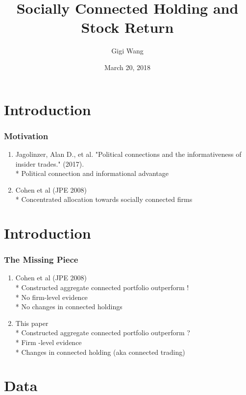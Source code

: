\documentclass{beamer}
\begin{document}
\title{Socially Connected Holding and Stock Return}
\author{Gigi Wang}
\date{March 20, 2018}
\maketitle

\section{Introduction}
\begin{frame}
\frametitle{Motivation}
\begin{enumerate}
	\item Jagolinzer, Alan D., et al. "Political connections and the informativeness of insider trades." (2017).
  \\ *  Political connection and informational advantage
  \item Cohen et al (JPE 2008)
  \\ *  Concentrated allocation towards socially connected firms
\end{enumerate}

\end{frame}


\section{Introduction}
\begin{frame}
\frametitle{The Missing Piece}
\begin{enumerate}
  \item Cohen et al (JPE 2008)
  \\ *  Constructed aggregate connected portfolio outperform !
  \\ *  No firm-level evidence
  \\ *  No changes in connected holdings
  \item  This paper
  \\ * Constructed aggregate connected portfolio outperform ?
  \\ * Firm -level evidence
  \\ * Changes in connected holding (aka connected trading)
\end{enumerate}

\end{frame}

\section{Data}
\end{document}
